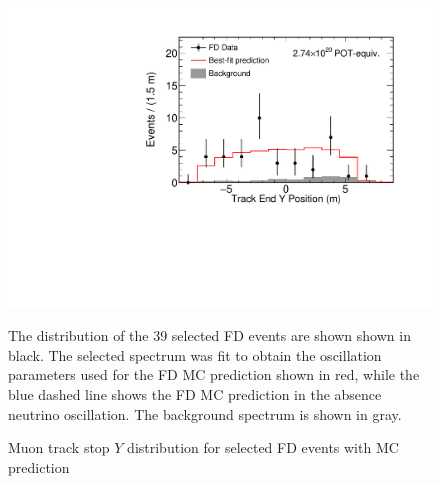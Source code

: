 \begin{figure}
\begin{center}
\includegraphics[width=\textwidth]{figures/results/fd_data_mc_numi_plots/trkEndY_unblind.pdf}
\end{center}
\caption{ Muon track stop $Y$ distribution for selected FD events with MC prediction }{
The distribution of the 39 selected FD events are shown shown in black.
The selected spectrum was fit to obtain the oscillation parameters used
for the FD MC prediction shown in red, while
the blue dashed line shows the FD MC prediction in the absence neutrino
oscillation.
The background spectrum is shown in gray.
}
\label{trkEndY_unblind}

\end{figure}



